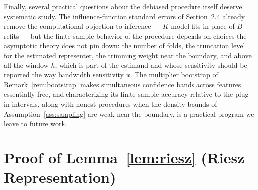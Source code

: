 \documentclass[12pt]{article}
\begin{document}
	Finally, several practical questions about the debiased procedure itself deserve
	systematic study. The influence-function standard errors of
	Section~2.4 already remove the computational objection to inference --- $K$ model fits in place of $B$ refits --- but the finite-sample
	behavior of the procedure depends on choices the asymptotic theory does not
	pin down: the number of folds, the truncation level for the estimated
	representer, the trimming weight near the boundary, and above all the window
	$h$, which is part of the estimand and whose sensitivity should be reported the
	way bandwidth sensitivity is. The multiplier bootstrap of
	Remark~\ref{rem:bootstrap} makes simultaneous confidence bands across features
	essentially free, and characterizing its finite-sample accuracy relative to the
	plug-in intervals, along with honest procedures when the density bounds of
	Assumption~\ref{ass:sampling} are weak near the boundary, is a practical program
	we leave to future work.
	
	\appendix
	
	\section{Proof of Lemma~\ref{lem:riesz} (Riesz Representation)}
	\label{app:lem_riesz}
	
\end{document}
